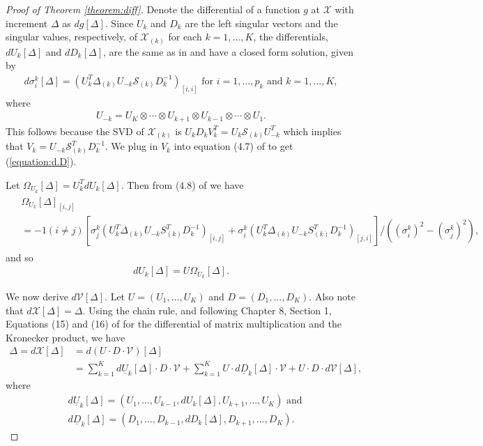 \begin{proof}[Proof of Theorem \ref{theorem:diff}]
Denote the differential of a function $g$ at $\mathcal{X}$ with increment $\Delta$ as $dg[\Delta]$. Since $U_k$ and $D_k$ are the left singular vectors and the singular values, respectively, of $\mathcal{X}_{(k)}$ for each $k = 1,\ldots,K$, the differentials, $dU_k[\Delta]$ and $dD_k[\Delta]$, are the same as in \cite{candes2013unbiased} and have a closed form solution, given by
\begin{align}
\label{equation:d.D}
d\sigma_i^k[\Delta] = (U_k^T\Delta_{(k)}U_{-k}\mathcal{S}_{(k)}D_k^{-1})_{[i,i]} \text{ for } i =1,\ldots,p_k \text{ and } k=1,\ldots,K,
\end{align}
where
\begin{align*}
U_{-k} = U_K\otimes \cdots \otimes U_{k+1} \otimes U_{k-1}\otimes\cdots\otimes U_1.
\end{align*}
This follows because the SVD of $\mathcal{X}_{(k)}$ is $U_kD_kV_k^T = U_k\mathcal{S}_{(k)}U_{-k}^T$ which implies that $V_k = U_{-k}\mathcal{S}_{(k)}^TD_{k}^{-1}$. We plug in $V_k$ into equation (4.7) of \cite{candes2013unbiased} to get (\ref{equation:d.D}). 

Let $\Omega_{U_k}[\Delta] = U_k^TdU_k[\Delta]$. Then from (4.8) of \cite{candes2013unbiased} we have
\begin{align}
\begin{split}
\label{equation:d.omega}
&\Omega_{U_k}[\Delta]_{[i,j]} \\
&= - 1(i \neq j)\left[\sigma_j^k(U_k^T\Delta_{(k)}U_{-k}S_{(k)}^TD_k^{-1})_{[i,j]} + \sigma_i^k(U_k^T\Delta_{(k)}U_{-k}S_{(k)}^TD_k^{-1})_{[j,i]}\right]/((\sigma_i^k)^2 - (\sigma_j^k)^2),
\end{split}
\end{align}
and so
\begin{align}
\label{equation:d.U}
dU_k[\Delta] = U\Omega_{U_k}[\Delta].
\end{align}

We now derive $d\mathcal{V}[\Delta]$. Let $U = (U_1,\ldots,U_K)$ and $D = (D_1,\ldots,D_K)$. Also note that $d\mathcal{X}[\Delta] = \Delta$. Using the chain rule, and following Chapter 8, Section 1, Equations (15) and (16) of \cite{magnus1999matrix} for the differential of matrix multiplication and the Kronecker product, we have
\begin{align}
\Delta = d\mathcal{X}[\Delta] &= d(U\cdot D \cdot\mathcal{V})[\Delta] \nonumber\\
&=\sum_{k=1}^Kd\underline{U}_k[\Delta] \cdot D \cdot \mathcal{V} + \sum_{k=1}^K U \cdot d\underline{D}_k[\Delta] \cdot \mathcal{V} + U \cdot D \cdot d\mathcal{V}[\Delta], \label{equation:chain.rule}
\end{align}
where
\begin{align}
&d\underline{U}_k[\Delta] = (U_1,\ldots,U_{k-1},dU_k[\Delta],U_{k+1},\ldots,U_K) \text{ and} \label{equation:U.underline}\\
&d\underline{D}_k[\Delta] = (D_1,\ldots,D_{k-1},dD_k[\Delta],D_{k+1},\ldots,D_K).
\end{align}


\end{proof}
